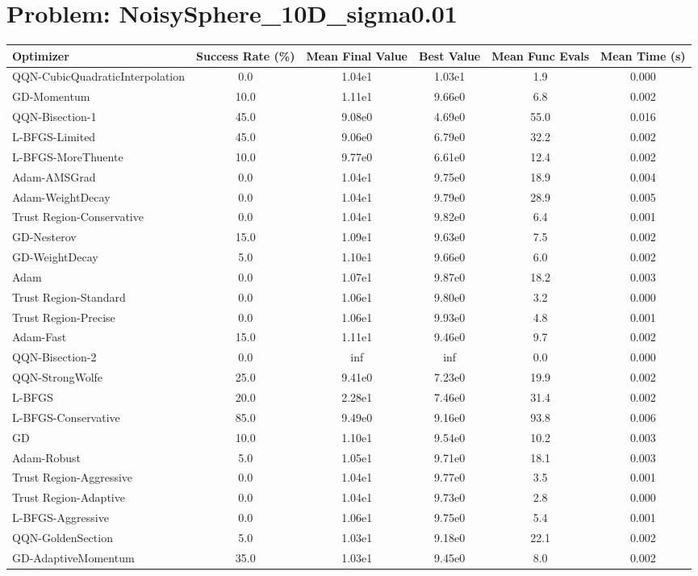 \documentclass{article}
\begin{document}
\section{Problem: NoisySphere\_10D\_sigma0.01}
\begin{longtable}{p{3cm}*{5}{c}}
\toprule
\textbf{Optimizer} & \textbf{Success Rate (\%)} & \textbf{Mean Final Value} & \textbf{Best Value} & \textbf{Mean Func Evals} & \textbf{Mean Time (s)} \\
\midrule
QQN-CubicQuadraticInterpolation & 0.0 & 1.04e1 & 1.03e1 & 1.9 & 0.000 \\
GD-Momentum & 10.0 & 1.11e1 & 9.66e0 & 6.8 & 0.002 \\
QQN-Bisection-1 & 45.0 & 9.08e0 & 4.69e0 & 55.0 & 0.016 \\
L-BFGS-Limited & 45.0 & 9.06e0 & 6.79e0 & 32.2 & 0.002 \\
L-BFGS-MoreThuente & 10.0 & 9.77e0 & 6.61e0 & 12.4 & 0.002 \\
Adam-AMSGrad & 0.0 & 1.04e1 & 9.75e0 & 18.9 & 0.004 \\
Adam-WeightDecay & 0.0 & 1.04e1 & 9.79e0 & 28.9 & 0.005 \\
Trust Region-Conservative & 0.0 & 1.04e1 & 9.82e0 & 6.4 & 0.001 \\
GD-Nesterov & 15.0 & 1.09e1 & 9.63e0 & 7.5 & 0.002 \\
GD-WeightDecay & 5.0 & 1.10e1 & 9.66e0 & 6.0 & 0.002 \\
Adam & 0.0 & 1.07e1 & 9.87e0 & 18.2 & 0.003 \\
Trust Region-Standard & 0.0 & 1.06e1 & 9.80e0 & 3.2 & 0.000 \\
Trust Region-Precise & 0.0 & 1.06e1 & 9.93e0 & 4.8 & 0.001 \\
Adam-Fast & 15.0 & 1.11e1 & 9.46e0 & 9.7 & 0.002 \\
QQN-Bisection-2 & 0.0 & inf & inf & 0.0 & 0.000 \\
QQN-StrongWolfe & 25.0 & 9.41e0 & 7.23e0 & 19.9 & 0.002 \\
L-BFGS & 20.0 & 2.28e1 & 7.46e0 & 31.4 & 0.002 \\
L-BFGS-Conservative & 85.0 & 9.49e0 & 9.16e0 & 93.8 & 0.006 \\
GD & 10.0 & 1.10e1 & 9.54e0 & 10.2 & 0.003 \\
Adam-Robust & 5.0 & 1.05e1 & 9.71e0 & 18.1 & 0.003 \\
Trust Region-Aggressive & 0.0 & 1.04e1 & 9.77e0 & 3.5 & 0.001 \\
Trust Region-Adaptive & 0.0 & 1.04e1 & 9.73e0 & 2.8 & 0.000 \\
L-BFGS-Aggressive & 0.0 & 1.06e1 & 9.75e0 & 5.4 & 0.001 \\
QQN-GoldenSection & 5.0 & 1.03e1 & 9.18e0 & 22.1 & 0.002 \\
GD-AdaptiveMomentum & 35.0 & 1.03e1 & 9.45e0 & 8.0 & 0.002 \\
\bottomrule
\end{longtable}
\end{document}
